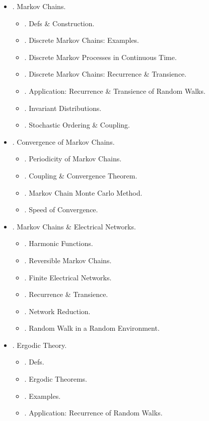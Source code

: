 \documentclass{article}
\begin{document}
\begin{enumerate}
\begin{itemize}
		\item {. Markov Chains.}
		\begin{itemize}
			\item {. Defs \& Construction.}
			\item {. Discrete Markov Chains: Examples.}
			\item {. Discrete Markov Processes in Continuous Time.}
			\item {. Discrete Markov Chains: Recurrence \& Transience.}
			\item {. Application: Recurrence \& Transience of Random Walks.}
			\item {. Invariant Distributions.}
			\item {. Stochastic Ordering \& Coupling.}
		\end{itemize}
		\item {. Convergence of Markov Chains.}
		\begin{itemize}
			\item {. Periodicity of Markov Chains.}
			\item {. Coupling \& Convergence Theorem.}
			\item {. Markov Chain Monte Carlo Method.}
			\item {. Speed of Convergence.}
		\end{itemize}
		\item {. Markov Chains \& Electrical Networks.}
		\begin{itemize}
			\item {. Harmonic Functions.}
			\item {. Reversible Markov Chains.}
			\item {. Finite Electrical Networks.}
			\item {. Recurrence \& Transience.}
			\item {. Network Reduction.}
			\item {. Random Walk in a Random Environment.}
		\end{itemize}
		\item {. Ergodic Theory.}
		\begin{itemize}
			\item {. Defs.}
			\item {. Ergodic Theorems.}
			\item {. Examples.}
			\item {. Application: Recurrence of Random Walks.}

\end{itemize}
\end{itemize}
\end{enumerate}
\end{document}
